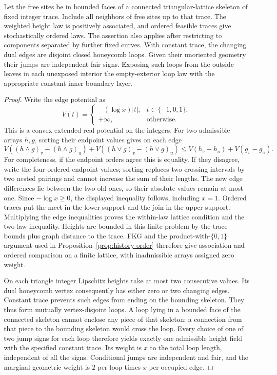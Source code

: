 \begin{lemma}\label{lem:height-order}
Let the free sites be in bounded faces of a connected triangular-lattice
skeleton of fixed integer trace. Include all neighbors of free sites up
to that trace. The weighted height law is positively associated, and
ordered feasible traces give stochastically ordered laws. The assertion
also applies after restricting to components separated by further fixed
curves. With constant trace, the changing dual edges are disjoint closed
honeycomb loops. Given their unoriented geometry their jumps are
independent fair signs. Exposing such loops from the outside leaves in
each unexposed interior the empty-exterior loop law with the appropriate
constant inner boundary layer.
\end{lemma}
\begin{proof}
Write the edge potential as
\[
 V(t)=\begin{cases}-(\log x)|t|,&t\in\{-1,0,1\},\\
                    +\infty,&\text{otherwise}.
       \end{cases}
\]
This is a convex extended-real potential on the integers. For two
admissible arrays $h,g$, sorting their endpoint values gives on each edge
\[
 V((h\wedge g)_v-(h\wedge g)_u)
 +V((h\vee g)_v-(h\vee g)_u)
 \le V(h_v-h_u)+V(g_v-g_u).
\]
For completeness, if the endpoint orders agree this is equality. If
they disagree, write the four ordered endpoint values; sorting replaces
two crossing intervals by two nested pairings and cannot increase the
sum of their lengths. The new edge differences lie between the two old
ones, so their absolute values remain at most one. Since $-\log x\ge0$,
the displayed inequality follows, including $x=1$. Ordered traces put
the meet in the lower support and the join in the upper support.
Multiplying the edge inequalities proves the within-law lattice
condition and the two-law inequality. Heights are bounded in this finite
problem by the trace bounds plus graph distance to the trace. FKG and
the product-with-$\{0,1\}$ argument used in
Proposition~\ref{prop:history-order} therefore give association and
ordered comparison on a finite lattice, with inadmissible arrays assigned
zero weight.

On each triangle integer Lipschitz heights take at most two consecutive
values. Its dual honeycomb vertex consequently has either zero or two
changing edges. Constant trace prevents such edges from ending on the
bounding skeleton. They thus form mutually vertex-disjoint loops. A
loop lying in a bounded face of the connected skeleton cannot enclose
any piece of that skeleton: a connection from that piece to the bounding
skeleton would cross the loop. Every choice of one of two jump signs
for each loop therefore yields exactly one admissible height field with
the specified constant trace. Its weight is $x$ to the total loop length,
independent of all the signs. Conditional jumps are independent and fair,
and the marginal geometric weight is $2$ per loop times $x$ per occupied
edge.


\end{proof}
